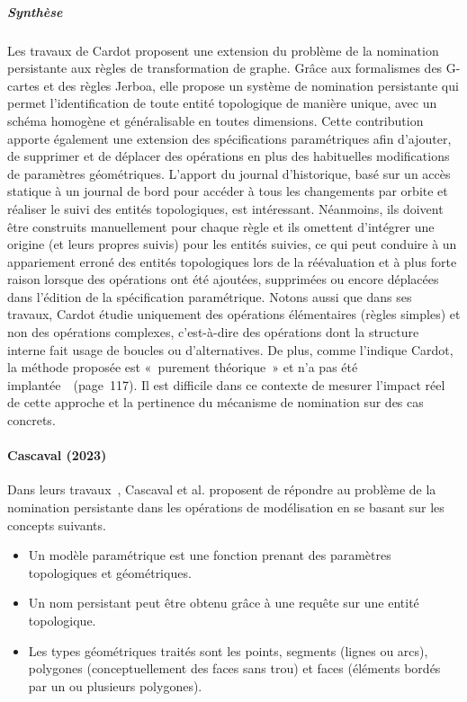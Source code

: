 \subparagraph{Synthèse}

Les travaux de Cardot proposent une extension du problème de la nomination
persistante aux règles de transformation de graphe. %
Grâce aux formalismes des G-cartes et des règles Jerboa, elle propose un système
de nomination persistante qui permet l'identification de toute entité
topologique de manière unique, avec un schéma homogène et généralisable en
toutes dimensions. %
Cette contribution apporte également une extension des spécifications
paramétriques afin d'ajouter, de supprimer et de déplacer des opérations en plus
des habituelles modifications de paramètres géométriques. %
L'apport du journal d'historique, basé sur un accès statique à un journal de
bord pour accéder à tous les changements par orbite et réaliser le suivi des
entités topologiques, est intéressant. %
Néanmoins, ils doivent être construits manuellement pour chaque règle et ils
omettent d'intégrer une origine (et leurs propres suivis) pour les entités
suivies, ce qui peut conduire à un appariement erroné des entités topologiques
lors de la réévaluation et à plus forte raison lorsque des opérations ont été
ajoutées, supprimées ou encore déplacées dans l'édition de la spécification
paramétrique. %
Notons aussi que dans ses travaux, Cardot étudie uniquement des opérations
élémentaires (règles simples) et non des opérations complexes, c'est-à-dire des
opérations dont la structure interne fait usage de boucles ou d'alternatives. %
De plus, comme l'indique Cardot, la méthode proposée est «~purement théorique~»
et n'a pas été implantée~\cite{cardot2019}~(page~117). %
Il est difficile dans ce contexte de mesurer l'impact réel de cette approche et
la pertinence du mécanisme de nomination sur des cas concrets.



\paragraph*{Cascaval (2023)}


Dans leurs travaux~\cite{cascaval2023lineage}, Cascaval et al. proposent de
répondre au problème de la nomination persistante dans les opérations de
modélisation en se basant sur les concepts
suivants.
\begin{itemize}
	\item Un modèle paramétrique est une fonction prenant des paramètres
	      topologiques et géométriques.
	\item Un nom persistant peut être obtenu grâce à une requête sur une entité
	      topologique.
	\item Les types géométriques traités sont les points, segments (lignes ou arcs),
	      polygones (conceptuellement des faces sans trou) et faces (éléments bordés
	      par un ou plusieurs polygones).
\end{itemize}

